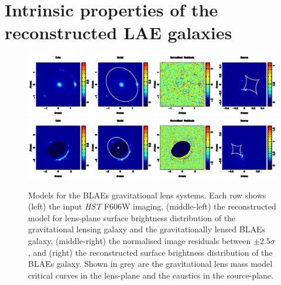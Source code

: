 \documentclass[a4paper,fleqn,usenatbib]{mnras}
\begin{document}
\section{Intrinsic properties of the reconstructed LAE galaxies}
\label{sec:results}
%

\begin{figure}
\begin{center} 
\includegraphics[width = 16 cm]{fig1a.ps}
\includegraphics[width = 16 cm]{fig1c.ps}
\caption{Models for the BLAEs gravitational lens systems. Each row shows (left) the input {\it HST} F606W imaging, (middle-left) the reconstructed model for lens-plane surface brightness distribution of the gravitational lensing galaxy and the gravitationally lensed BLAEs galaxy, (middle-right) the normalised image residuals between $\pm2.5\sigma$, and (right) the reconstructed surface brightness distribution of the BLAEs galaxy. Shown in grey are the gravitational lens mass model critical curves in the lens-plane and the caustics in the source-plane.}
\label{fig:res_1}
\end{center}     
 \end{figure}
 
\end{document}
